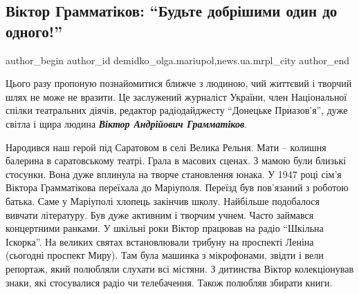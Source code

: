  
 
 
 
 
 
\subsection{Віктор Грамматіков: \enquote{Будьте добрішими один до одного!}}
\label{sec:11_08_2021.stz.news.ua.mrpl_city.1.viktor_grammatikov}
 
\ifcmt
 author_begin
   author_id demidko_olga.mariupol,news.ua.mrpl_city
 author_end
\fi

Цього разу пропоную познайомитися ближче з людиною, чий життєвий і творчий шлях
не може не вразити. Це заслужений журналіст України, член Національної спілки
театральних діячів, редактор радіодайджесту \enquote{Донецьке Приазов'я}, дуже світла і
щира людина \emph{\textbf{Віктор Андрійович Грамматіков}}.


Народився наш герой під Саратовом в селі Велика Рельня. Мати – колишня балерина
в саратовському театрі. Грала в масових сценах. З мамою були близькі стосунки.
Вона дуже вплинула на творче становлення юнака. У 1947 році сім'я Віктора
Грамматікова переїхала до Маріуполя. Переїзд був пов'язаний з роботою батька.
Саме у Маріуполі хлопець закінчив школу. Найбільше подобалося вивчати
літературу. Був дуже активним і творчим учнем. Часто займався концертними
ранками. У шкільні роки Віктор працював на радіо \enquote{Шкільна Іскорка}. На великих
святах встановлювали трибуну на проспекті Леніна (сьогодні проспект Миру). Там
була машинка з мікрофонами, звідти і вели репортаж, який полюбляли слухати всі
містяни. З дитинства Віктор колекціонував знаки, які стосувалися радіо чи
телебачення. Також полюбляв збирати книги.

